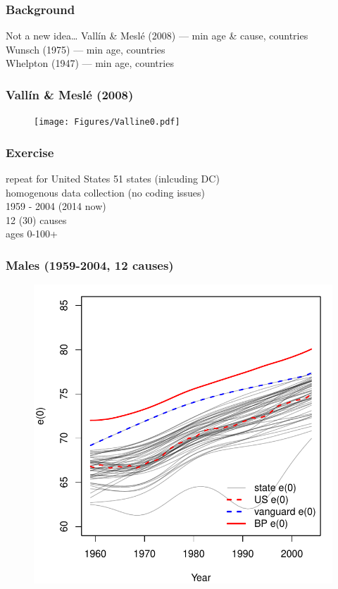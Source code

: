 \documentclass[20pt]{beamer}
\begin{document}
\begin{frame}
\frametitle{Background}
\begin{block}{Not a new idea\ldots}
Vall\'{i}n \& Mesl{\'e} (2008) --- min age \& cause, countries\\
Wunsch (1975) --- min age, countries\\
Whelpton (1947) --- min age, countries
\end{block}
\end{frame}

\begin{frame}
\frametitle{Vall\'{i}n \& Mesl{\'e} (2008)}
\begin{figure}[b]
    \centering
    \texttt{[image: Figures/Valline0.pdf]}
\end{figure} 
\end{frame}

\begin{frame}
\frametitle{Exercise}
\begin{block}{repeat for United States}
51 states (inlcuding DC)\\
homogenous data collection (no coding issues)\\
1959 - 2004 (2014 now)\\
12 (30) causes\\
ages 0-100+
\end{block}
\end{frame}

\begin{frame}
\frametitle{Males (1959-2004, 12 causes)}
\begin{figure}[b]
    \centering
    \includegraphics[scale=1.2]{Figures/e0trendsM.pdf}
\end{figure} 
\end{frame}
\end{document}
